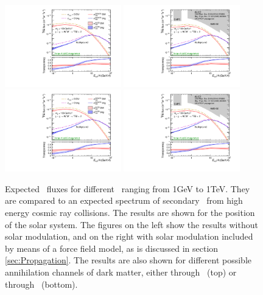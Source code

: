 \begin{figure}
    \centering
    \includegraphics[width=0.45\textwidth]{figures/Antihelium_fluxes_LISWW_100GeV.pdf}
    \includegraphics[width=0.45\textwidth]{figures/Antihelium_fluxes_solar_modulated_WW_100GeV.pdf}
    \includegraphics[width=0.45\textwidth]{figures/Antihelium_fluxes_LISWW_100GeV.pdf}
    \includegraphics[width=0.45\textwidth]{figures/Antihelium_fluxes_solar_modulated_WW_100GeV.pdf}
    \caption{Expected \ahe\ fluxes for different \dmm\ ranging from 1GeV to 1TeV. They are compared to an expected spectrum of secondary \ahe\ from high energy cosmic ray collisions. The results are shown for the position of the solar system. The figures on the left show the results without solar modulation, and on the right with solar modulation included by means of a force field model, as is discussed in section \ref{sec:Propagation}. The results are also shown for different possible annihilation channels of dark matter, either through \WW\ (top) or through \bb\ (bottom).}
    \label{fig:Results_He3_fluxes_diff_DM_masses}
\end{figure}
